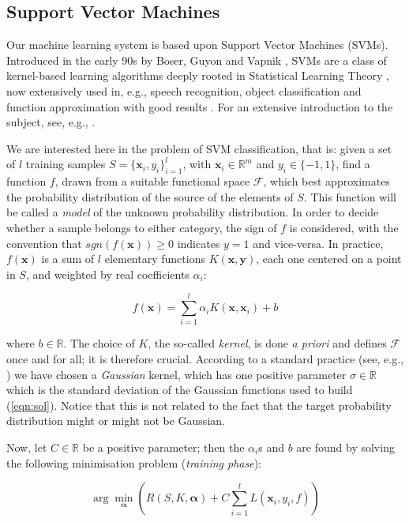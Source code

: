 \documentclass[a4paper,10pt,conference]{ieeeconf}
\def\RR{\mathbb{R}}
\def\xx{\mathbf{x}}
\def\yy{\mathbf{y}}
\def\aa{\boldsymbol{\alpha}}
\begin{document}
\subsection{Support Vector Machines}
\label{subsec:svm}

Our machine learning system is based upon Support Vector Machines
(SVMs). Introduced in the early 90s by Boser, Guyon and Vapnik
\cite{BGV92}, SVMs are a class of kernel-based learning algorithms
deeply rooted in Statistical Learning Theory \cite{v-edbed-82}, now
extensively used in, e.g., speech recognition, object classification
and function approximation with good results \cite{Cristianini00}. For
an extensive introduction to the subject, see, e.g., \cite{Burges98}.

We are interested here in the problem of SVM classification, that is:
given a set of $l$ training samples $S=\{\xx_i,y_i\}_{i=1}^l$, with
$\xx_i \in \RR^m$ and $y_i \in \{-1,1\}$, find a function $f$, drawn
from a suitable functional space $\mathcal{F}$, which best
approximates the probability distribution of the source of the
elements of $S$. This function will be called a \emph{model} of the
unknown probability distribution. In order to decide whether a sample
belongs to either category, the sign of $f$ is considered, with the
convention that $sgn(f(\xx)) \geq 0$ indicates $y = 1$ and
vice-versa. In practice, $f(\xx)$ is a sum of $l$ elementary functions
$K(\xx,\yy)$, each one centered on a point in $S$, and weighted by
real coefficients $\alpha_i$:

\begin{equation} \label{eqn:sol}
  f(\xx) = \sum_{i=1}^l \alpha_i K(\xx,\xx_i) + b
\end{equation}

\noindent where $b \in \RR$. The choice of $K$, the so-called
\emph{kernel}, is done \emph{a priori} and defines $\mathcal{F}$ once
and for all; it is therefore crucial. According to a standard practice
(see, e.g., \cite{Cristianini00}) we have chosen a \emph{Gaussian}
kernel, which has one positive parameter $\sigma \in \RR$ which is the
standard deviation of the Gaussian functions used to build
(\ref{eqn:sol}). Notice that this is not related to the fact that the
target probability distribution might or might not be Gaussian.

Now, let $C \in \RR$ be a positive parameter; then the $\alpha_i$s and
$b$ are found by solving the following minimisation problem
(\emph{training phase}):

\begin{equation} \label{eqn:svm_primal}
  \arg \min_{\aa} \left( R(S,K,\aa) + C \sum_{i=1}^l L(\xx_i,y_i,f) \right)
\end{equation}
\end{document}

